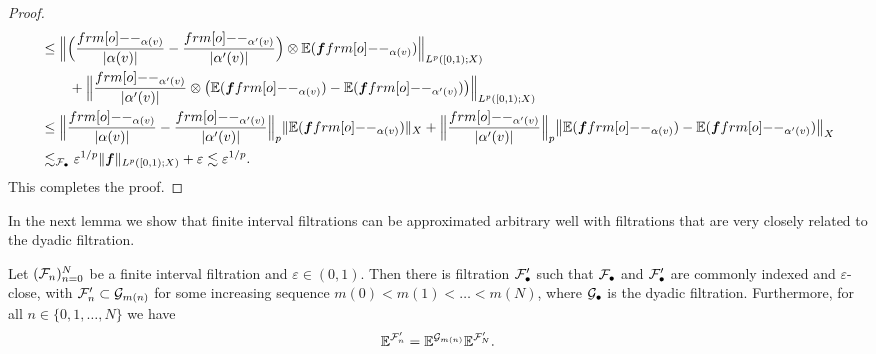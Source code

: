 \begin{proof}
\begin{equation*}
\begin{aligned}
    &\leq \Big\| \Big( \frac{\1_{\alpha(v)}}{|\alpha(v)|} - \frac{\1_{\alpha'(v)}}{|\alpha'(v)|}\Big) \otimes \E(\mb{f}\1_{\alpha(v)}) \Big\|_{L^p([0,1);X)} \\
    &\qquad + \Big\| \frac{\1_{\alpha'(v)}}{|\alpha'(v)|} \otimes \big( \E(\mb{f}\1_{\alpha(v)}) -  \E(\mb{f}\1_{\alpha'(v)}) \big)\Big\|_{L^p([0,1);X)}\\
    &\leq  \Big\| \frac{\1_{\alpha(v)}}{|\alpha(v)|} - \frac{\1_{\alpha'(v)}} {|\alpha'(v)|} \Big\|_{p} \| \E(\mb{f}\1_{\alpha(v)}) \|_{X}
    + \Big\| \frac{\1_{\alpha'(v)}}{|\alpha'(v)|} \Big\|_{p} \big\|  \E(\mb{f}\1_{\alpha(v)}) -  \E(\mb{f}\1_{\alpha'(v)}) \big\|_{X} \\
    &\lesssim_{\mc{F}_{\bullet}} \varepsilon^{1/p} \|\mb{f}\|_{L^p([0,1);X)} + \varepsilon \lesssim \varepsilon^{1/p}.
  \end{aligned}
\end{equation*}
This completes the proof.
\end{proof}


In the next lemma we show that finite interval filtrations can be approximated arbitrary well with filtrations that are very closely related to the dyadic filtration.

\begin{lem}\label{lem:dyadic-approximation}
  Let $(\mathcal{F}_{n})_{n=0}^{N}$ be a finite interval filtration and $\varepsilon \in (0,1)$.
  Then there is filtration $\mathcal{F}'_{\bullet}$ such that $\mathcal{F}_{\bullet}$ and $\mathcal{F}'_{\bullet}$ are commonly indexed and $\varepsilon$-close, with $\mathcal{F}'_{n} \subset \mathcal{G}_{m(n)}$ for some increasing sequence $m(0) < m(1) < \ldots < m(N)$, where $\mathcal{G}_{\bullet}$ is the dyadic filtration.
  Furthermore, for all $n \in \{0,1,\ldots,N\}$ we have
  \begin{equation}\label{eq:approx-CE-ident}
    \mathbb{E}^{\mathcal{F}'_{n}} = \mathbb{E}^{\mathcal{G}_{m(n)}} \mathbb{E}^{\mathcal{F}'_{N}}.
  \end{equation}
\end{lem}

